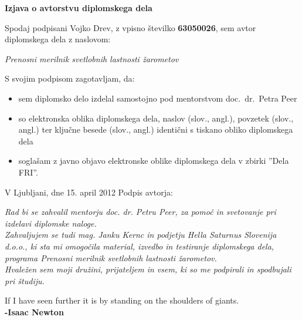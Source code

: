 \documentclass[oneside, a4paper, 12pt]{book}
\newcommand{\clearemptydoublepage}{\newpage{\pagestyle{empty}\cleardoublepage}}
\begin{document}
\clearemptydoublepage

\vspace*{1cm}
\begin{center} 
{\Large \textbf{\sc Izjava o avtorstvu diplomskega dela}}
\end{center}

\vspace{1cm}
\noindent Spodaj podpisani Vojko Drev,
z vpisno številko \textbf{63050026}, sem avtor  diplomskega dela z naslovom:
   
\vspace{0.5cm}
\emph{Prenosni merilnik svetlobnih lastnosti žarometov}

\vspace{1.5cm}
\noindent S svojim podpisom zagotavljam, da:
\begin{itemize}
	\item sem diplomsko delo izdelal samostojno pod mentorstvom 
		doc.\ dr.\ Petra Peer 

	\item	so elektronska oblika diplomskega dela, naslov (slov., angl.), povzetek (slov., angl.) ter ključne besede (slov., angl.) identični s tiskano obliko diplomskega dela
	\item soglašam z javno objavo elektronske oblike diplomskega dela v zbirki ''Dela FRI''.
\end{itemize}

\vspace{1cm}
\noindent V Ljubljani, dne 15. april 2012 \hfill Podpis avtorja:

\clearemptydoublepage

\thispagestyle{empty}\mbox{}\vfill\null\it%
Rad bi se zahvalil mentorju doc. dr. Petru Peer, za pomoč in svetovanje pri izdelavi diplomske naloge. \\
Zahvaljujem se tudi mag. Janku Kernc in podjetju Hella Saturnus Slovenija d.o.o., ki sta mi omogočila material, izvedbo in testiranje diplomskega dela, programa Prenosni merilnik svetlobnih lastnosti žarometov. \\
Hvaležen sem moji družini, prijateljem in vsem, ki so me podpirali in spodbujali pri študiju.
\rm\normalfont

\clearemptydoublepage

\thispagestyle{empty}\mbox{}{\textheight}\mbox{}\hfill\begin{minipage}{0.90\textwidth}%
\begin{flushright}
If I have seen further it is by standing on the shoulders of giants.\\
\textbf{-Isaac Newton}
\end{flushright}
\normalfont\end{minipage}
 
\end{document}
